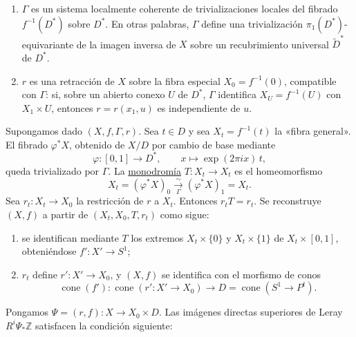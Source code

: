 \begin{enumerate}[label=(\alph*),leftmargin=2.6em]
\item $\Gamma$ es un sistema localmente coherente de trivializaciones locales
del fibrado $f^{-1}(D^*)$ sobre $D^*$. En otras palabras, $\Gamma$ define una
trivialización $\pi_1(D^*)$-equivariante de la imagen inversa de $X$ sobre un
recubrimiento universal $\widetilde D^*$ de $D^*$.

\item $r$ es una retracción de $X$ sobre la fibra especial
$X_0=f^{-1}(0)$, compatible con $\Gamma$: si, sobre un abierto conexo $U$ de
$D^*$, $\Gamma$ identifica $X_U=f^{-1}(U)$ con $X_1\times U$, entonces
$r=r(x_1,u)$ es independiente de $u$.
\end{enumerate}

Supongamos dado $(X,f,\Gamma,r)$. Sea $t\in D$ y sea
$X_t=f^{-1}(t)$ la «fibra general». El fibrado $\varphi^*X$, obtenido de
$X/D$ por cambio de base mediante
\begin{equation*}
\varphi:[0,1]\longrightarrow D^*,
\qquad x\longmapsto \exp(2\pi i x)\,t,
\end{equation*}
queda trivializado por $\Gamma$. La \underline{monodromía}
$T:X_t\longrightarrow X_t$ es el homeomorfismo
\begin{equation*}
X_t=(\varphi^*X)_0\xrightarrow[\Gamma]{\sim}
(\varphi^*X)_1=X_t.
\end{equation*}
Sea $r_t:X_t\longrightarrow X_0$ la restricción de $r$ a $X_t$. Entonces
$r_tT=r_t$. Se reconstruye $(X,f)$ a partir de $(X_t,X_0,T,r_t)$ como sigue:
\begin{enumerate}[label=(\alph*),leftmargin=2.6em]
\item se identifican mediante $T$ los extremos $X_t\times\{0\}$ y
$X_t\times\{1\}$ de $X_t\times[0,1]$, obteniéndose
$f':X'\longrightarrow S^1$;
\item $r_t$ define $r':X'\longrightarrow X_0$, y $(X,f)$ se identifica con
el morfismo de conos
\begin{equation*}
\operatorname{cone}(f'):
\operatorname{cone}(r':X'\longrightarrow X_0)
\longrightarrow D=\operatorname{cone}(S^1\longrightarrow P^t).
\end{equation*}
\end{enumerate}

\pageoriginale

Pongamos $\Psi=(r,f):X\longrightarrow X_0\times D$. Las imágenes directas
superiores de Leray $R^i\Psi_*\mathbb Z$ satisfacen la condición siguiente:

